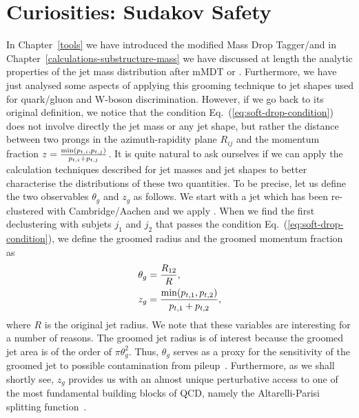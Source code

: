 
\chapter{Curiosities: Sudakov Safety}\label{sec:curiosities}
In Chapter~\ref{tools} we have introduced the modified Mass Drop
Tagger/\SD and in Chapter~\ref{calculations-substructure-mass} we have
discussed at length the analytic properties of the jet mass
distribution after mMDT or \SD. Furthermore, we have just analysed
some aspects of applying this grooming technique to jet shapes used
for quark/gluon and W-boson discrimination.
%
However, if we go back to its original definition, we notice that the
\SD condition Eq.~(\ref{eq:soft-drop-condition}) does not involve
directly the jet mass or any jet shape, but rather the distance
between two prongs in the azimuth-rapidity plane $R_{ij}$ and the
momentum fraction
$ z=\tfrac{{\rm min}(p_{t,i},p_{t,j})}{p_{t,i}+p_{t,j}} $. It is quite
natural to ask ourselves if we can apply the calculation techniques
described for jet masses and jet shapes to better characterise the
distributions of these two quantities. To be precise, let us define the
two observables $\theta_g$ and $z_g$ as follows. We start with a jet
which has been re-clustered with Cambridge/Aachen and we apply \SD. When we find the
first declustering with subjets $j_1$ and $j_2$ that passes the \SD
condition Eq.~(\ref{eq:soft-drop-condition}), we define the groomed radius
and the groomed momentum fraction as
\begin{align}\label{eq:thetag-zg-def}
\theta_g& = \frac{R_{12}}{R}, \\
z_g &= \frac{{\rm min}(p_{t,1},p_{t,2})}{p_{t,1}+p_{t,2}},
\end{align}
where $R$ is the original jet radius.
We note that these variables are interesting for a number of
reasons. 
%
The groomed jet radius is of interest because the groomed jet area is
of the order of $\pi \theta_g^2$.  Thus, $\theta_g$ serves as a proxy for the sensitivity of the groomed jet to possible contamination from pileup~\cite{Cacciari:2008gn,Sapeta:2010uk}.
Furthermore, as we shall shortly see, $z_g$ provides us with an almost unique perturbative access to one of the most fundamental building blocks of QCD, namely the Altarelli-Parisi splitting function~\cite{Larkoski:2015lea,Larkoski:2017bvj}.


